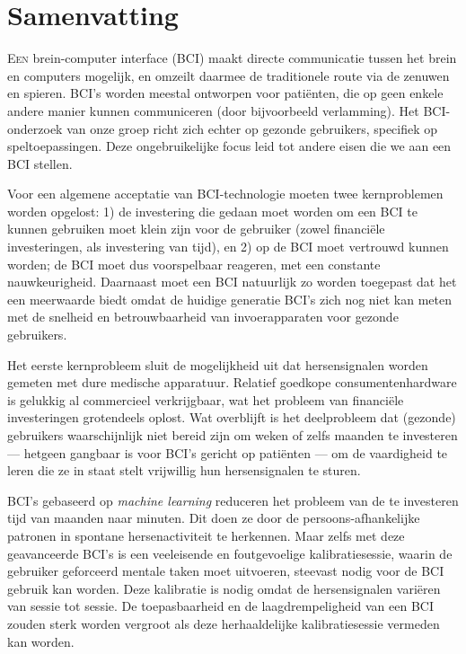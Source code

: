 \chapter{Samenvatting}
\lettrine{E}{en} brein-computer interface (BCI) maakt directe communicatie
tussen het brein en computers mogelijk, en omzeilt daarmee de traditionele
route via de zenuwen en spieren. BCI's worden meestal ontworpen voor patiënten,
die op geen enkele andere manier kunnen communiceren (door bijvoorbeeld
verlamming). Het BCI-onderzoek van onze groep richt zich echter op gezonde
gebruikers, specifiek op speltoepassingen. Deze ongebruikelijke focus leid
tot andere eisen die we aan een BCI stellen.

Voor een algemene acceptatie van BCI-technologie moeten twee kernproblemen
worden opgelost: 1) de investering die gedaan moet worden om een BCI te kunnen
gebruiken moet klein zijn voor de gebruiker (zowel financiële investeringen, als
investering van tijd), en 2) op de BCI moet vertrouwd kunnen worden; de BCI
moet dus voorspelbaar reageren, met een constante nauwkeurigheid. Daarnaast
moet een BCI natuurlijk zo worden toegepast dat het een meerwaarde biedt omdat
de huidige generatie BCI's zich nog niet kan meten met de snelheid en
betrouwbaarheid van invoerapparaten voor gezonde gebruikers.

Het eerste kernprobleem sluit de mogelijkheid uit dat hersensignalen worden
gemeten met dure medische apparatuur. Relatief goedkope consumentenhardware is
gelukkig al commercieel verkrijgbaar, wat het probleem van financiële
investeringen grotendeels oplost. Wat overblijft is het deelprobleem dat
(gezonde) gebruikers waarschijnlijk niet bereid zijn om weken of zelfs maanden
te investeren --- hetgeen gangbaar is voor BCI's gericht op patiënten --- om de
vaardigheid te leren die ze in staat stelt vrijwillig hun hersensignalen te
sturen.
  
BCI's gebaseerd op \emph{machine learning} reduceren het probleem van de te
investeren tijd van maanden naar minuten. Dit doen ze door de
persoons-afhankelijke patronen in spontane hersenactiviteit te herkennen. Maar
zelfs met deze geavanceerde BCI's is een veeleisende en foutgevoelige
kalibratiesessie, waarin de gebruiker geforceerd mentale taken moet uitvoeren,
steevast nodig voor de BCI gebruik kan worden. Deze kalibratie is nodig omdat
de hersensignalen variëren van sessie tot sessie. De toepasbaarheid en de
laagdrempeligheid van een BCI zouden sterk worden vergroot als deze
herhaaldelijke kalibratiesessie vermeden kan worden.

